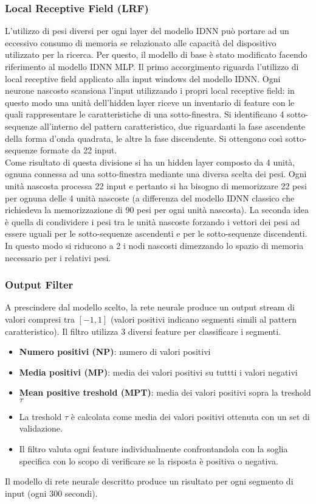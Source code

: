 \documentclass[12pt]{article}
\begin{document}
 			\subsubsection{Local Receptive Field (LRF)} 
 				L'utilizzo di pesi diversi per ogni layer del modello IDNN può portare ad un eccessivo consumo di memoria se relazionato alle capacità del dispositivo utilizzato per la ricerca. Per questo, il modello di base è stato modificato facendo riferimento al modello IDNN MLP. Il primo accorgimento riguarda l'utilizzo di local receptive field applicato alla input windows del modello IDNN. %
 				Ogni neurone nascosto scansiona l'input utilizzando i propri local receptive field: in questo modo una unità dell'hidden layer riceve un inventario di feature con le quali rappresentare le caratteristiche di una sotto-finestra. Si identificano 4 sotto-sequenze all'interno del pattern caratteristico, due riguardanti la fase ascendente della forma d'onda quadrata, le altre la fase discendente. Si ottengono così sotto-sequenze formate da 22 input.\\
 				Come risultato di questa divisione si ha un hidden layer composto da 4 unità, ognuna connessa ad una sotto-finestra mediante una diversa scelta dei pesi. Ogni unità nascosta processa 22 input e pertanto si ha bisogno di memorizzare 22 pesi per ognuna delle 4 unità nascoste (a differenza del modello IDNN classico che richiedeva la memorizzazione di 90 pesi per ogni unità nascosta). La seconda idea è quella di condividere i pesi tra le unità nascoste forzando i vettori dei pesi ad essere uguali per le sotto-sequenze ascendenti e per le sotto-sequenze discendenti. In questo modo si riducono a 2 i nodi nascosti dimezzando lo spazio di memoria necessario per i relativi pesi. 
 			\subsubsection{Output Filter}
 				A prescindere dal modello scelto, la rete neurale produce un output stream di valori compresi tra $[-1,1]$ (valori positivi indicano segmenti simili al pattern caratteristico). Il filtro utilizza 3 diversi feature per classificare i segmenti. 
 				\begin{itemize}
 					\item \textbf{Numero positivi (NP)}: numero di valori positivi
 					\item \textbf{Media positivi (MP)}: media dei valori positivi su tuttti i valori negativi
 					\item \textbf{Mean positive treshold (MPT)}: media dei valori positivi sopra la treshold $\tau$
 					\item La treshold $\tau$ è calcolata come media dei valori positivi ottenuta con un set di validazione.
 					\item Il filtro valuta ogni feature individualmente confrontandola con la soglia specifica con lo scopo di verificare se la risposta è positiva o negativa.
 				\end{itemize}
 				Il modello di rete neurale descritto produce un risultato per ogni segmento di input (ogni 300 secondi).
\end{document}
